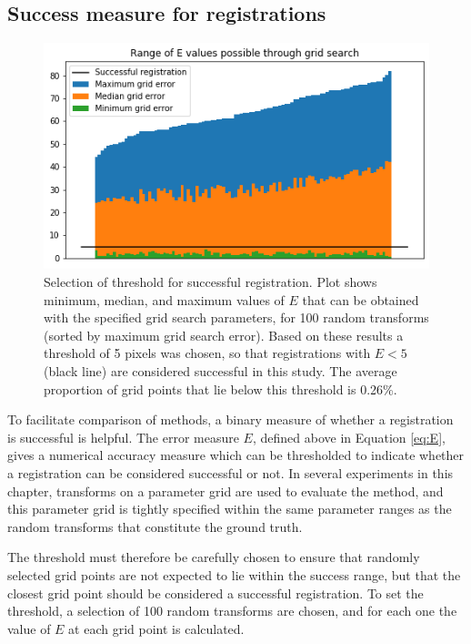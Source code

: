 \documentclass{report}
\begin{document}
\subsection{Success measure for registrations}
\label{sec:success}
\begin{figure}
\centering
\includegraphics[width=5in]{grid_Es_2.png}
\caption{Selection of threshold for successful registration. Plot shows minimum, median, and maximum values of $E$ that can be obtained with the specified grid search parameters, for 100 random transforms (sorted by maximum grid search error). Based on these results a threshold of 5 pixels was chosen, so that registrations with $E<5$ (black line) are considered successful in this study. The average proportion of grid points that lie below this threshold is 0.26\%.}
\label{fig:grid_errors}
\end{figure}

To facilitate comparison of methods, a binary measure of whether a registration is successful is helpful. The error measure $E$, defined above in Equation \ref{eq:E}, gives a numerical accuracy measure which can be thresholded to indicate whether a registration can be considered successful or not. In several experiments in this chapter, transforms on a parameter grid are used to evaluate the method, and this parameter grid is tightly specified within the same parameter ranges as the random transforms that constitute the ground truth.

The threshold must therefore be carefully chosen to ensure that randomly selected grid points are not expected to lie within the success range, but that the closest grid point should be considered a successful registration. To set the threshold, a selection of 100 random transforms are chosen, and for each one the value of $E$ at each grid point is calculated.
\end{document}
